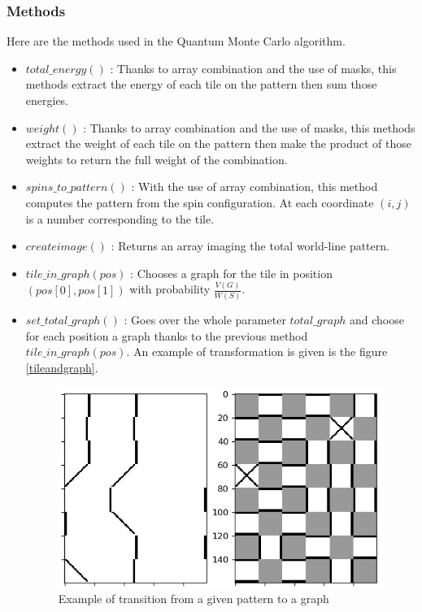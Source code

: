 \documentclass[a4paper,12pt]{article}
\begin{document}
	\subsubsection{Methods}
	Here are the methods used in the Quantum Monte Carlo algorithm. 
	\begin{itemize}[label=$\star$]
		\item $total\_energy()$ : Thanks to array combination and the use of masks, this methods extract the energy of each tile on the pattern then sum those energies.
		\item $weight()$ : Thanks to array combination and the use of masks, this methods extract the weight of each tile on the pattern then make the product of those weights to return the full weight of the combination.
		\item $spins\_to\_pattern()$ : With the use of array combination, this method computes the pattern from the spin configuration. At each coordinate $(i,j)$ is a number corresponding to the tile.
		\item $createimage()$ : Returns an array imaging the total world-line pattern.
		\item $tile\_in\_graph(pos)$ : Chooses a graph for the tile in position \\ $(pos[0], pos[1])$ with probability $\frac{V(G)}{W(S)}$.
		\item $set\_total\_graph()$ : Goes over the whole parameter $total\_graph$ and choose for each position a graph thanks to the previous method \\ $tile\_in\_graph(pos)$. An example of transformation is given is the figure \ref{tileandgraph}.
		\begin{figure}[H]
			\centering
			\includegraphics[]{tileandgraph.png}
			\caption{Example of transition from a given pattern to a graph}

\end{figure}
\end{itemize}
\end{document}
